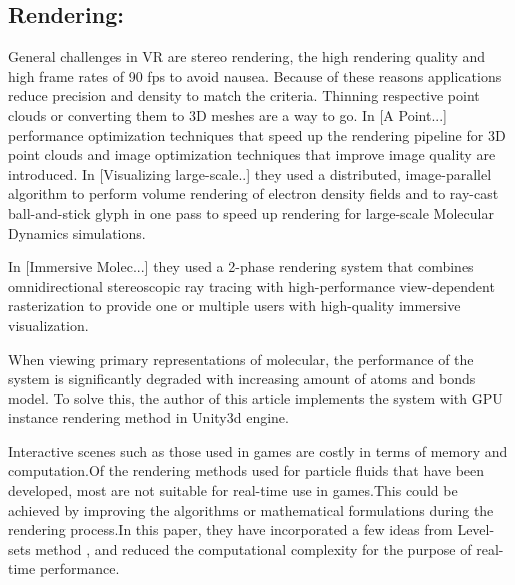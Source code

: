 \documentclass[10pt,twocolumn,letterpaper]{article}
\begin{document}
\subsection{Rendering:}
General challenges in VR are stereo rendering, the high rendering quality and high frame rates of 90 fps to avoid nausea. Because of these reasons applications reduce precision and density to match the criteria. Thinning respective point clouds or converting them to 3D meshes are a way to go. In [A Point...] performance optimization techniques that speed up the rendering pipeline for 3D point clouds and image optimization techniques that improve image quality are introduced. In [Visualizing large-scale..] they used a distributed, image-parallel algorithm to perform volume rendering of electron density fields and to ray-cast ball-and-stick glyph in one pass to speed up rendering for large-scale Molecular Dynamics simulations.

 In [Immersive Molec...] they used a 2-phase rendering system that combines omnidirectional stereoscopic ray tracing with high-performance view-dependent rasterization to provide one or multiple users with high-quality immersive visualization. 

 When viewing primary representations of molecular, the performance of the system is significantly degraded with increasing amount of atoms and bonds model. To solve this, the author of this article \cite{Wiebrands2018} implements the system with GPU instance rendering method in Unity3d engine. 

Interactive scenes such as those used in games are costly in terms of memory and computation.Of the rendering methods used for particle fluids that have been developed, most are not suitable for real-time use in games.This could be achieved by improving the algorithms or mathematical formulations during the rendering process.In this paper\cite{VanderLaan2009}, they have incorporated a few ideas from Level-sets method , and reduced the computational complexity for the purpose of real-time performance.
\end{document}
